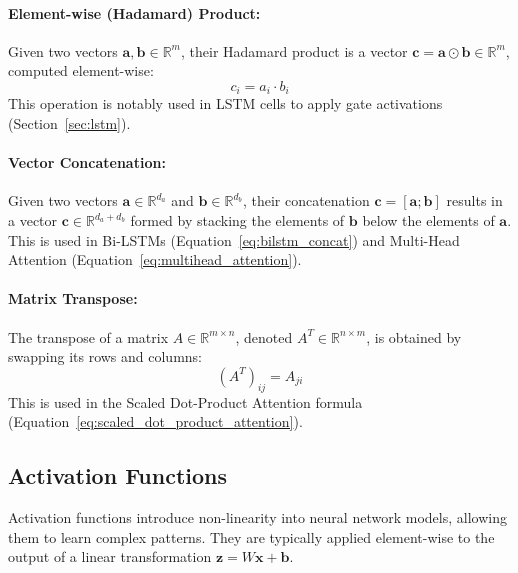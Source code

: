 \paragraph{Element-wise (Hadamard) Product:}
Given two vectors \( \bm{a}, \bm{b} \in \mathbb{R}^m \), their Hadamard product is a vector \( \bm{c} = \bm{a} \odot \bm{b} \in \mathbb{R}^m \), computed element-wise:
\begin{equation}
  c_i = a_i \cdot b_i
\end{equation}
This operation is notably used in LSTM cells to apply gate activations (Section~\ref{sec:lstm}).

\paragraph{Vector Concatenation:}
Given two vectors \( \bm{a} \in \mathbb{R}^{d_a} \) and \( \bm{b} \in \mathbb{R}^{d_b} \), their concatenation \( \bm{c} = [\bm{a} ; \bm{b}] \) results in a vector \( \bm{c} \in \mathbb{R}^{d_a + d_b} \) formed by stacking the elements of \( \bm{b} \) below the elements of \( \bm{a} \). This is used in Bi-LSTMs (Equation~\ref{eq:bilstm_concat}) and Multi-Head Attention (Equation~\ref{eq:multihead_attention}).

\paragraph{Matrix Transpose:}
The transpose of a matrix \( A \in \mathbb{R}^{m \times n} \), denoted \( A^T \in \mathbb{R}^{n \times m} \), is obtained by swapping its rows and columns:
\begin{equation}
  (A^T)_{ij} = A_{ji}
\end{equation}
This is used in the Scaled Dot-Product Attention formula (Equation~\ref{eq:scaled_dot_product_attention}).


\subsection{Activation Functions}
Activation functions introduce non-linearity into neural network models, allowing them to learn complex patterns. They are typically applied element-wise to the output of a linear transformation \( \bm{z} = W\bm{x} + \bm{b} \).

